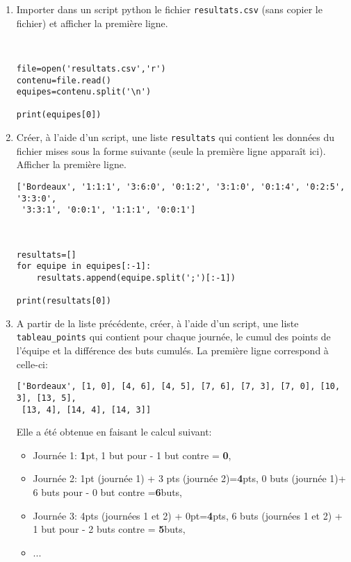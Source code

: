 \begin{enumerate}
\item Importer dans un script python le fichier \verb?resultats.csv? (sans copier le fichier) et afficher la première ligne.

\begin{solution}~\ \\
\begin{verbatim}
file=open('resultats.csv','r')
contenu=file.read()
equipes=contenu.split('\n')

print(equipes[0])
\end{verbatim}
\end{solution}

\item Créer, à l'aide d'un script, une liste \verb?resultats? qui contient les données du fichier mises sous la forme suivante (seule la première ligne apparaît ici). Afficher la première ligne.

\begin{verbatim}
['Bordeaux', '1:1:1', '3:6:0', '0:1:2', '3:1:0', '0:1:4', '0:2:5', '3:3:0',
 '3:3:1', '0:0:1', '1:1:1', '0:0:1']
\end{verbatim}

\begin{solution}~\ \\
\begin{verbatim}
resultats=[]
for equipe in equipes[:-1]:
    resultats.append(equipe.split(';')[:-1])

print(resultats[0])
\end{verbatim}
\end{solution}


\item A partir de la liste précédente, créer, à l'aide d'un script, une liste \verb?tableau_points? qui contient pour chaque journée, le cumul des points de l'équipe et la différence des buts cumulés. La première ligne correspond à celle-ci:

\begin{verbatim}
['Bordeaux', [1, 0], [4, 6], [4, 5], [7, 6], [7, 3], [7, 0], [10, 3], [13, 5],
 [13, 4], [14, 4], [14, 3]]
\end{verbatim}

Elle a été obtenue en faisant le calcul suivant:
\begin{itemize}
 \item Journée 1: \textbf{1}pt, 1 but pour - 1 but contre = \textbf{0},
 \item Journée 2: 1pt (journée 1) + 3 pts (journée 2)=\textbf{4}pts, 0 buts (journée 1)+ 6 buts pour - 0 but contre =\textbf{6}buts,
 \item Journée 3: 4pts (journées 1 et 2) + 0pt=\textbf{4}pts, 6 buts (journées 1 et 2) + 1 but pour - 2 buts contre = \textbf{5}buts,
 \item ...
\end{itemize}


\end{enumerate}
